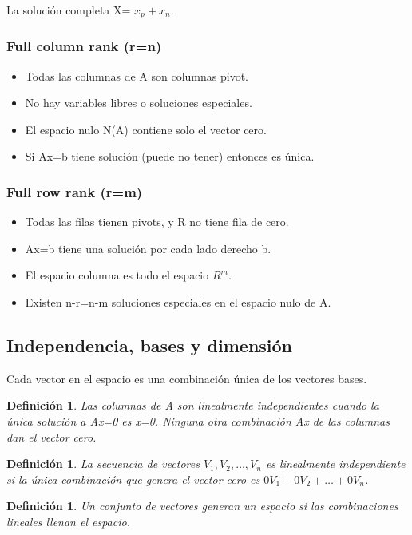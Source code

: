 \documentclass[]{article}
\newtheorem{definicion}[def1]{Definición}
\begin{document}
La soluci\'on completa X= $x_p + x_n$.

\subsubsection{Full column rank (r=n)}
\begin{itemize}
	\item Todas las columnas de A son columnas pivot.
	\item No hay variables libres o soluciones especiales.
	\item El espacio nulo N(A) contiene solo el vector cero.
	\item Si Ax=b tiene soluci\'on (puede no tener) entonces es \'unica.
\end{itemize}

\subsubsection{Full row rank (r=m)}
\begin{itemize}
	\item Todas las filas tienen pivots, y R no tiene fila de cero.
	\item Ax=b tiene una soluci\'on por cada lado derecho b.
	\item El espacio columna es todo el espacio $R^m$.
	\item Existen n-r=n-m soluciones especiales en el espacio nulo de A.
\end{itemize}

\subsection{Independencia, bases y dimensi\'on}
Cada vector en el espacio es una combinaci\'on \'unica de los vectores bases.
\begin{definicion}
	Las columnas de A son linealmente independientes cuando la \'unica soluci\'on a Ax=0 es x=0. Ninguna otra combinaci\'on Ax de las columnas dan el vector cero.
\end{definicion}
\begin{definicion}
	La secuencia de vectores $V_1, V_2, \ldots , V_n$ es linealmente independiente si la \'unica combinaci\'on que genera el vector cero es $0V_1+0V_2+\ldots+0V_n$.
\end{definicion}
\begin{definicion}
	Un conjunto de vectores generan un espacio si las combinaciones lineales llenan el espacio.
\end{definicion}
\end{document}
